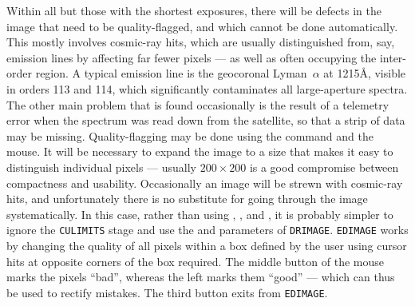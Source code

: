 \begin{latexonly}
Within all but those with the shortest exposures, there will be defects
in the image that need to be quality-flagged, and which cannot be done
automatically.  This mostly involves cosmic-ray hits, which are usually
distinguished from, say, emission lines by affecting far fewer pixels ---
as well as often occupying the inter-order region.  A typical emission line
is the geocoronal Lyman~$\alpha$ at 1215{\AA}, visible in orders 113 and 114,
which significantly contaminates all large-aperture spectra.
The other main problem that is found occasionally is the result of a telemetry
error when the spectrum was read down from the satellite, so that a strip of
data may be missing.  Quality-flagging may be done using the command
 and the mouse.
It will be necessary to expand the image to a
size that makes it easy to distinguish individual pixels --- usually
$200\times 200$ is a good compromise between compactness and usability.
Occasionally an image will be strewn with cosmic-ray hits, and unfortunately
there is no substitute for going through the image systematically.  In this
case, rather than using ,
, and ,
it is probably simpler to ignore the \verb+CULIMITS+ stage and use the
 and  parameters of 
\verb+DRIMAGE+\@. \verb+EDIMAGE+ works by
changing the quality of all pixels within a box defined by the user using
cursor hits at opposite corners of the box required.  The middle button of the
mouse marks the pixels ``bad'', whereas the left marks them ``good'' --- which
can thus be used to rectify mistakes.  The third button exits from
\verb+EDIMAGE+\@.
\end{latexonly}

